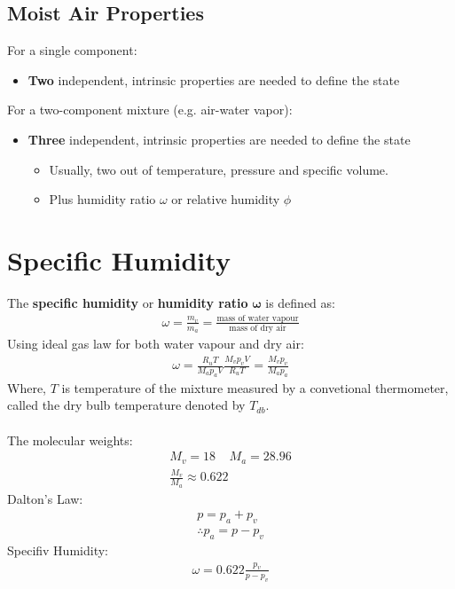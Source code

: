 \subsection{Moist Air Properties}
For a single component:
\begin{itemize}[noitemsep]
  \item \textbf{Two} independent, intrinsic properties are needed to define the state
\end{itemize}
For a two-component mixture (e.g. air-water vapor):
\begin{itemize}[noitemsep]
  \item \textbf{Three} independent, intrinsic properties are needed to define the state
        \begin{itemize}[noitemsep]
          \item Usually, two out of temperature, pressure
                and specific volume.
          \item Plus humidity ratio $\omega$ or relative humidity $\phi$
        \end{itemize}
\end{itemize}
\section{Specific Humidity}
The \textbf{specific humidity} or \textbf{humidity ratio} $\mathbf{\omega}$ is defined as:
\begin{gather}
  \omega = \frac{m_v}{m_a} = \frac{\text{mass of water vapour}}{\text{mass of dry air}}
\end{gather}
Using ideal gas law for both water vapour and dry air:
\begin{gather}
  \omega = \frac{R_u T}{M_a p_a V}\frac{M_v p_v V}{R_u T} = \frac{M_v p_v}{M_a p_a}
\end{gather}
Where, $T$ is temperature of the mixture measured by a convetional thermometer, called the dry bulb temperature denoted by $T_{db}$. \\\\
The molecular weights:
\begin{gather}
  M_v = 18 \ \ \ \ \ M_a = 28.96 \\[5pt]
  \frac{M_v}{M_a} \approx 0.622
\end{gather}
Dalton’s Law:
\begin{gather}
  p = p_a + p_v \\[5pt]
  \therefore p_a = p - p_v
\end{gather}
Specifiv Humidity:
\begin{gather}
  \omega = 0.622\frac{p_v}{p-p_v}
\end{gather}
